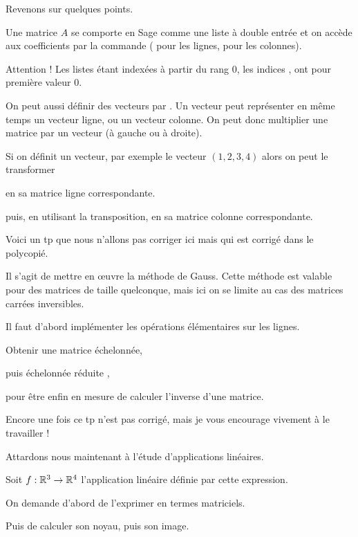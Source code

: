 Revenons sur quelques points.

 Une matrice $A$ se comporte en Sage comme une liste à double entrée et 
  on accède aux coefficients par la commande  (
  pour les lignes,  pour les colonnes).
  
\change  
  Attention ! Les listes étant indexées à partir du rang $0$, les
  indices ,  ont pour première valeur $0$.


\change
On peut aussi définir des vecteurs par
  .
  Un vecteur peut représenter en même temps un vecteur ligne, 
  ou un vecteur colonne. On peut donc multiplier une matrice 
  par un vecteur (à gauche ou à droite).
  
\change   
 Si on définit un vecteur, par exemple  le vecteur $(1,2,3,4)$ alors on peut le transformer 

 \change
en sa  matrice ligne correspondante.
 
 \change
puis, en utilisant la transposition, en sa matrice colonne correspondante.   


\diapo

Voici un tp que nous n'allons pas corriger ici mais qui est corrigé dans le polycopié.

Il s'agit de mettre en \oe uvre la méthode de Gauss.
Cette méthode est valable pour des matrices de taille quelconque, 
mais ici on se limite au cas des matrices carrées inversibles.

Il faut d'abord implémenter les opérations élémentaires sur les lignes.

Obtenir une matrice échelonnée,

puis échelonnée réduite ,

pour être enfin en mesure de calculer l'inverse d'une matrice.

Encore une fois ce tp n'est pas corrigé, mais je vous encourage vivement à le travailler !



\diapo

Attardons nous maintenant à l'étude d'applications linéaires.

Soit $f : \mathbb{R}^3 \to \mathbb{R}^4$ l'application linéaire définie par
cette expression.

On demande d'abord de l'exprimer en termes matriciels.

Puis de calculer son noyau, puis son image.


